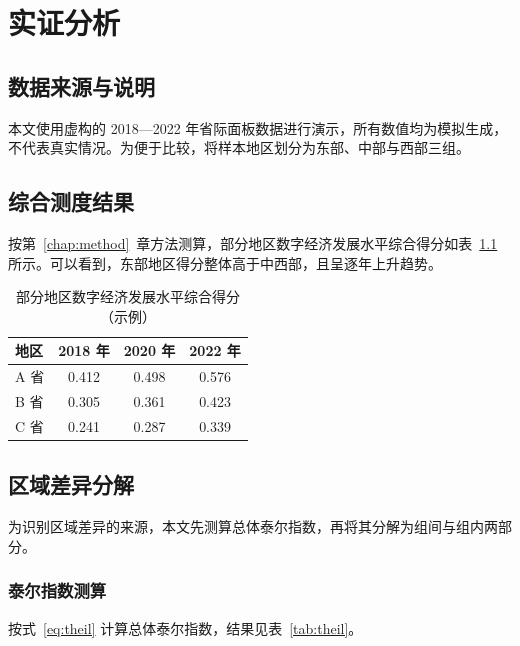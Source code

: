 \chapter{实证分析}
\label{chap:empirical}

\section{数据来源与说明}

本文使用虚构的 2018—2022 年省际面板数据进行演示，所有数值均为模拟生成，不代表真实情况。为便于比较，将样本地区划分为东部、中部与西部三组。

\section{综合测度结果}

按第~\ref{chap:method}~章方法测算，部分地区数字经济发展水平综合得分如表~\ref{tab:score} 所示。可以看到，东部地区得分整体高于中西部，且呈逐年上升趋势。

\begin{table}[!htbp]
    \centering
    \caption{部分地区数字经济发展水平综合得分（示例）}
    \label{tab:score}
    \wuhao\songti
    \begin{tabular}{lccc}
        \toprule
        地区 & 2018 年 & 2020 年 & 2022 年 \\
        \midrule
        A 省 & 0.412 & 0.498 & 0.576 \\
        B 省 & 0.305 & 0.361 & 0.423 \\
        C 省 & 0.241 & 0.287 & 0.339 \\
        \bottomrule
    \end{tabular}

\end{table}

\section{区域差异分解}

为识别区域差异的来源，本文先测算总体泰尔指数，再将其分解为组间与组内两部分。

\subsection{泰尔指数测算}

按式~\eqref{eq:theil} 计算总体泰尔指数，结果见表~\ref{tab:theil}。


